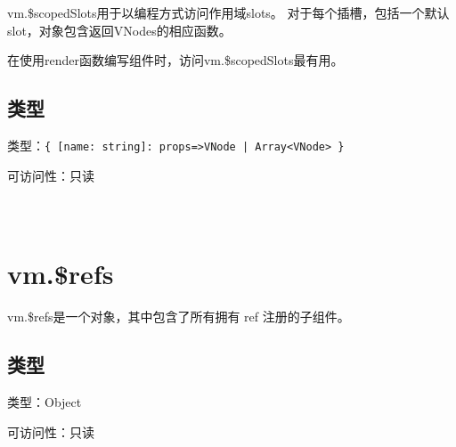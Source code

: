 vm.\$scopedSlots用于以编程方式访问作用域slots。 对于每个插槽，包括一个默认slot，对象包含返回VNodes的相应函数。

在使用render函数编写组件时，访问vm.\$scopedSlots最有用。

\subsection{类型}



\begin{compactitem}
\item 类型：\texttt{\{ [name: string]: props=>VNode | Array<VNode> \}}
\item 可访问性：只读
\end{compactitem}

\begin{lstlisting}[language=JavaScript]

\end{lstlisting}




\begin{lstlisting}[language=JavaScript]

\end{lstlisting}




\begin{lstlisting}[language=JavaScript]

\end{lstlisting}



\section{vm.\$refs}

vm.\$refs是一个对象，其中包含了所有拥有 ref 注册的子组件。


\subsection{类型}

\begin{compactitem}
\item 类型：Object
\item 可访问性：只读
\end{compactitem}



\begin{lstlisting}[language=JavaScript]

\end{lstlisting}




